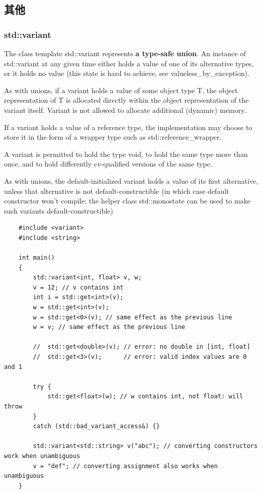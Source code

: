 \documentclass[UTF8,a4paper,12pt]{ctexbook}
\begin{document}
		\subsection{其他}
			\subsubsection{std::variant}
				The class template std::variant represents\textbf{ a type-safe union}. An instance of std::variant at any given time either holds a value of one of its alternative types, or it holds no value (this state is hard to achieve, see valueless\_by\_exception).
				
				As with unions, if a variant holds a value of some object type T, the object representation of T is allocated directly within the object representation of the variant itself. Variant is not allowed to allocate additional (dynamic) memory.
				
				If a variant holds a value of a reference type, the implementation may choose to store it in the form of a wrapper type such as std::reference\_wrapper.
				
				A variant is permitted to hold the type void, to hold the same type more than once, and to hold differently cv-qualified versions of the same type.
				
				As with unions, the default-initialized variant holds a value of its first alternative, unless that alternative is not default-constructible (in which case default constructor won't compile: the helper class std::monostate can be used to make such variants default-constructible)
\begin{lstlisting}
	#include <variant>
	#include <string>
	
	int main()
	{
		std::variant<int, float> v, w;
		v = 12; // v contains int
		int i = std::get<int>(v);
		w = std::get<int>(v);
		w = std::get<0>(v); // same effect as the previous line
		w = v; // same effect as the previous line
		
		//  std::get<double>(v); // error: no double in [int, float]
		//  std::get<3>(v);      // error: valid index values are 0 and 1
		
		try {
			std::get<float>(w); // w contains int, not float: will throw
		}
		catch (std::bad_variant_access&) {}
		
		std::variant<std::string> v("abc"); // converting constructors work when unambiguous
		v = "def"; // converting assignment also works when unambiguous
	}
\end{lstlisting} 
\end{document}

